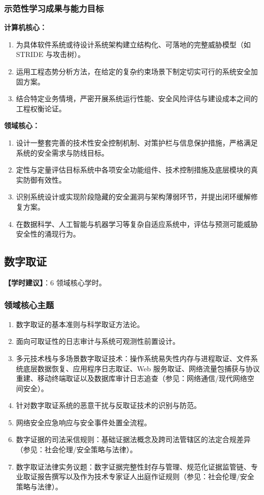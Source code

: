 \subsubsection{示范性学习成果与能力目标}
\textbf{计算机核心：}
\begin{enumerate}\setlength{\itemsep}{0pt}\setlength{\parskip}{0pt}
    \item 为具体软件系统或待设计系统架构建立结构化、可落地的完整威胁模型（如 STRIDE 与攻击树）。
    \item 运用工程态势分析方法，在给定的复杂约束场景下制定切实可行的系统安全加固方案。
    \item 结合特定业务情境，严密开展系统运行性能、安全风险评估与建设成本之间的工程权衡论证。
\end{enumerate}
\textbf{领域核心：}
\begin{enumerate}\setlength{\itemsep}{0pt}\setlength{\parskip}{0pt}\setcounter{enumi}{3}
    \item 设计一整套完善的技术性安全控制机制、对策护栏与信息保护措施，严格满足系统的安全需求与防线目标。
    \item 定性与定量评估目标系统中各项安全功能组件、技术控制措施及底层模块的真实防御有效性。
    \item 识别系统设计或实现阶段隐藏的安全漏洞与架构薄弱环节，并提出闭环缓解修复方案。
    \item 在数据科学、人工智能与机器学习等复杂自适应系统中，评估与预测可能威胁安全性的涌现行为。
\end{enumerate}

\subsection{数字取证}
\textbf{【学时建议】}：6 领域核心学时。

\subsubsection{领域核心主题}
\begin{enumerate}\setlength{\itemsep}{0pt}\setlength{\parskip}{0pt}
    \item 数字取证的基本准则与科学取证方法论。
    \item 面向可取证性的日志审计与系统可观测性前置设计。
    \item 多元技术栈与多场景数字取证技术：操作系统易失性内存与进程取证、文件系统底层数据恢复、应用程序日志取证、Web 服务取证、网络流量包捕获与协议重建、移动终端取证以及数据库审计日志追查（参见：网络通信/现代网络空间安全）。
    \item 针对数字取证系统的恶意干扰与反取证技术的识别与防范。
    \item 网络安全应急响应与安全事件处置全流程。
    \item 数字证据的司法采信规则：基础证据法概念及跨司法管辖区的法定合规差异（参见：社会伦理/安全策略与法律）。
    \item 数字取证法律实务议题：数字证据完整性封存与管理、规范化证据监管链、专业取证报告撰写以及作为技术专家证人出庭作证规则（参见：社会伦理/安全策略与法律）。
\end{enumerate}

